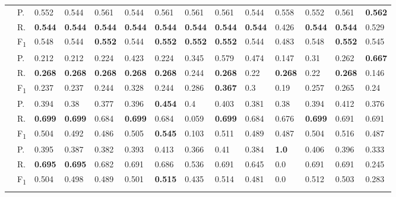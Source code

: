 \begin{tabularx}{\textwidth}{p{1.3em}l Z  Z  Z  Z  Z  Z  Z  Z  Z  Z  Z  Z }
    & P.    & 0.552    & 0.544    & 0.561    & 0.544    & 0.561    & 0.561    & 0.561    & 0.544    & 0.558    & 0.552    & 0.561    & \textbf{ 0.562 } \\
    & R.    & \textbf{ 0.544 }    & \textbf{ 0.544 }    & \textbf{ 0.544 }    & \textbf{ 0.544 }    & \textbf{ 0.544 }    & \textbf{ 0.544 }    & \textbf{ 0.544 }    & \textbf{ 0.544 }    & 0.426    & \textbf{ 0.544 }    & \textbf{ 0.544 }    & 0.529 \\
    & F\textsubscript{1}    & 0.548    & 0.544    & \textbf{ 0.552 }    & 0.544    & \textbf{ 0.552 }    & \textbf{ 0.552 }    & \textbf{ 0.552 }    & 0.544    & 0.483    & 0.548    & \textbf{ 0.552 }    & 0.545 \\
     \midrule {}

    & P.    & 0.212    & 0.212    & 0.224    & 0.423    & 0.224    & 0.345    & 0.579    & 0.474    & 0.147    & 0.31    & 0.262    & \textbf{ 0.667 } \\
    & R.    & \textbf{ 0.268 }    & \textbf{ 0.268 }    & \textbf{ 0.268 }    & \textbf{ 0.268 }    & \textbf{ 0.268 }    & 0.244    & \textbf{ 0.268 }    & 0.22    & \textbf{ 0.268 }    & 0.22    & \textbf{ 0.268 }    & 0.146 \\
    & F\textsubscript{1}    & 0.237    & 0.237    & 0.244    & 0.328    & 0.244    & 0.286    & \textbf{ 0.367 }    & 0.3    & 0.19    & 0.257    & 0.265    & 0.24 \\
     \midrule {}

    & P.    & 0.394    & 0.38    & 0.377    & 0.396    & \textbf{ 0.454 }    & 0.4    & 0.403    & 0.381    & 0.38    & 0.394    & 0.412    & 0.376 \\
    & R.    & \textbf{ 0.699 }    & \textbf{ 0.699 }    & 0.684    & \textbf{ 0.699 }    & 0.684    & 0.059    & \textbf{ 0.699 }    & 0.684    & 0.676    & \textbf{ 0.699 }    & 0.691    & 0.691 \\
    & F\textsubscript{1}    & 0.504    & 0.492    & 0.486    & 0.505    & \textbf{ 0.545 }    & 0.103    & 0.511    & 0.489    & 0.487    & 0.504    & 0.516    & 0.487 \\
     \midrule {}

    & P.    & 0.395    & 0.387    & 0.382    & 0.393    & 0.413    & 0.366    & 0.41    & 0.384    & \textbf{ 1.0 }    & 0.406    & 0.396    & 0.333 \\
    & R.    & \textbf{ 0.695 }    & \textbf{ 0.695 }    & 0.682    & 0.691    & 0.686    & 0.536    & 0.691    & 0.645    & 0.0    & 0.691    & 0.691    & 0.245 \\
    & F\textsubscript{1}    & 0.504    & 0.498    & 0.489    & 0.501    & \textbf{ 0.515 }    & 0.435    & 0.514    & 0.481    & 0.0    & 0.512    & 0.503    & 0.283 \\
     \midrule {}


\end{tabularx}
